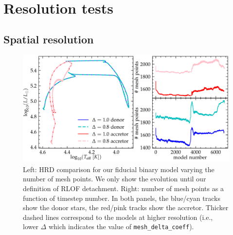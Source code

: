 \documentclass[twocolumn,twocolappendix,trackchanges]{aastex63}
\begin{document}
\section{Resolution tests}
\label{sec:res_tests}
\subsection{Spatial resolution}

\begin{figure}[htbp]
  \centering
  \includegraphics[width=\textwidth]{spatial_res_plot}
  \caption{Left: HRD comparison for our fiducial binary model varying
  the number of mesh points. We only show the evolution until our definition
  of RLOF detachment. Right: number of mesh points as a
  function of timestep number. In both panels, the blue/cyan tracks show the donor stars, the
red/pink tracks show the accretor. Thicker dashed lines correspond to
the models at higher resolution (i.e., lower $\Delta$ which indicates
the value of \texttt{mesh\_delta\_coeff}).}
\end{figure}




\end{document}
